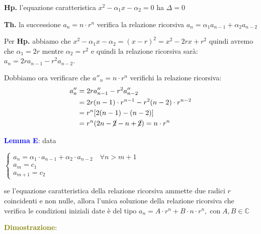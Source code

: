 \begin{flushleft}
\begin{boxA}
        {\centering
            \begin{minipage}[t]{0.45\textwidth}
                \centering
                \textbf{Hp.} l'equazione caratteristica $x^2-\alpha_1x-\alpha_2 = 0$ ha $\Delta = 0$
            \end{minipage}
            \hfill
            \begin{minipage}[t]{0.45\textwidth}
                \centering
                \textbf{Th.} la successione $a_n = n \cdot r^n$ verifica la relazione ricorsiva $a_n = \alpha_1a_{n-1} + \alpha_2a_{n-2}$
            \end{minipage}
        \par}
        
        \begin{flushleft}
            Per \textbf{Hp.} abbiamo che $x^2 - \alpha_1x - \alpha_2 = (x-r)^2 = x^2 - 2rx + r^2$ quindi avremo che $\alpha_1 = 2r$ mentre $\alpha_2 = r^2$ e quindi la relazione ricorsiva sarà: $a_n = 2ra_{n-1} - r^2a_{n-2}$.

            Dobbiamo ora verificare che $a''_n = n \cdot r^n$ verifichi la relazione ricorsiva: 
            \begin{align*}
                a''_n &= 2ra''_{n-1} - r^2a''_{n-2} \\
                &= 2r(n-1) \cdot r^{n-1} - r^2(n-2) \cdot r^{n-2} \\
                &= r^n[2(n-1) - (n-2)] \\
                &= r^n(2n - \cancel{2} - n + \cancel{2}) = n \cdot r^n
            \end{align*}
        \end{flushleft}
    \end{boxA}
    \textcolor{blue}{\textbf{Lemma E}}: data

    {\centering
        $\begin{cases}
            a_n = \alpha_1 \cdot a_{n-1} + \alpha_2 \cdot a_{n-2} \quad \forall n > m + 1 \\
            a_m = c_1 \\
            a_{m+1} = c_2
        \end{cases}$
    \par}
    se l'equazione caratteristica della relazione ricorsiva ammette due radici $r$ coincidenti e non nulle, allora l'unica soluzione della relazione ricorsiva che verifica le condizioni iniziali date è del tipo $a_n = A \cdot r^n + B \cdot n \cdot r^n, \; \text{con} \; A, B \in \mathbb{C}$
    \begin{boxA}
        \textcolor{olive}{\textbf{Dimostrazione}}:


\end{boxA}
\end{flushleft}
